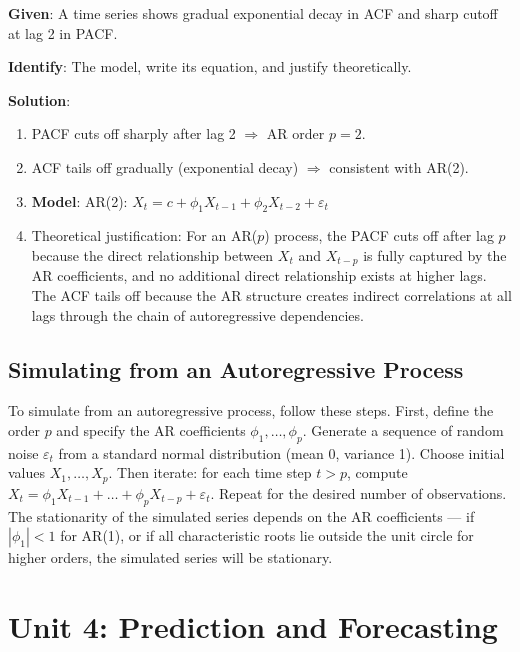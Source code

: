 \documentclass[11pt,a4paper]{article}
\begin{document}
\begin{tcolorbox}[colback=green!5!white,colframe=green!75!black,title=\textbf{Worked Example 10: ACF/PACF Model Identification}]
\textbf{Given}: A time series shows gradual exponential decay in ACF and sharp cutoff at lag 2 in PACF.

\textbf{Identify}: The model, write its equation, and justify theoretically.

\textbf{Solution}:
\begin{enumerate}
    \item PACF cuts off sharply after lag 2 $\Rightarrow$ AR order $p = 2$.
    \item ACF tails off gradually (exponential decay) $\Rightarrow$ consistent with AR(2).
    \item \textbf{Model}: AR(2): $X_t = c + \phi_1 X_{t-1} + \phi_2 X_{t-2} + \varepsilon_t$
    \item Theoretical justification: For an AR($p$) process, the PACF cuts off after lag $p$ because the direct relationship between $X_t$ and $X_{t-p}$ is fully captured by the AR coefficients, and no additional direct relationship exists at higher lags. The ACF tails off because the AR structure creates indirect correlations at all lags through the chain of autoregressive dependencies.
\end{enumerate}
\end{tcolorbox}

\subsection{Simulating from an Autoregressive Process}

To simulate from an autoregressive process, follow these steps. First, define the order $p$ and specify the AR coefficients $\phi_1, \ldots, \phi_p$. Generate a sequence of random noise $\varepsilon_t$ from a standard normal distribution (mean 0, variance 1). Choose initial values $X_1, \ldots, X_p$. Then iterate: for each time step $t > p$, compute $X_t = \phi_1 X_{t-1} + \ldots + \phi_p X_{t-p} + \varepsilon_t$. Repeat for the desired number of observations. The stationarity of the simulated series depends on the AR coefficients --- if $|\phi_1| < 1$ for AR(1), or if all characteristic roots lie outside the unit circle for higher orders, the simulated series will be stationary.


\section{Unit 4: Prediction and Forecasting}
\end{document}
